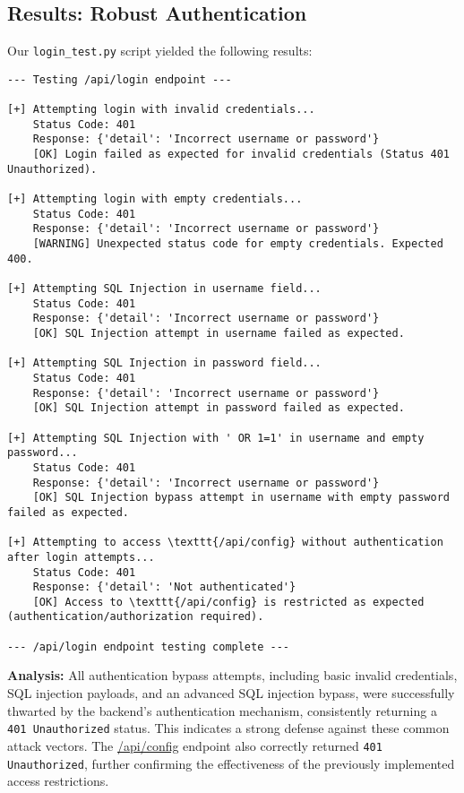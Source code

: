 \documentclass{article}
\begin{document}
\subsection{Results: Robust Authentication}
Our \texttt{login\_test.py} script yielded the following results:
\begin{lstlisting}[language=text, caption=Output from \texttt{login\_test.py}]
--- Testing /api/login endpoint ---

[+] Attempting login with invalid credentials...
    Status Code: 401
    Response: {'detail': 'Incorrect username or password'}
    [OK] Login failed as expected for invalid credentials (Status 401 Unauthorized).

[+] Attempting login with empty credentials...
    Status Code: 401
    Response: {'detail': 'Incorrect username or password'}
    [WARNING] Unexpected status code for empty credentials. Expected 400.

[+] Attempting SQL Injection in username field...
    Status Code: 401
    Response: {'detail': 'Incorrect username or password'}
    [OK] SQL Injection attempt in username failed as expected.

[+] Attempting SQL Injection in password field...
    Status Code: 401
    Response: {'detail': 'Incorrect username or password'}
    [OK] SQL Injection attempt in password failed as expected.

[+] Attempting SQL Injection with ' OR 1=1' in username and empty password...
    Status Code: 401
    Response: {'detail': 'Incorrect username or password'}
    [OK] SQL Injection bypass attempt in username with empty password failed as expected.

[+] Attempting to access \texttt{/api/config} without authentication after login attempts...
    Status Code: 401
    Response: {'detail': 'Not authenticated'}
    [OK] Access to \texttt{/api/config} is restricted as expected (authentication/authorization required).

--- /api/login endpoint testing complete ---
\end{lstlisting}

\textbf{Analysis:}
All authentication bypass attempts, including basic invalid credentials, SQL injection payloads, and an advanced SQL injection bypass, were successfully thwarted by the backend's authentication mechanism, consistently returning a \texttt{401 Unauthorized} status. This indicates a strong defense against these common attack vectors. The \url{/api/config} endpoint also correctly returned \texttt{401 Unauthorized}, further confirming the effectiveness of the previously implemented access restrictions.
\end{document}
